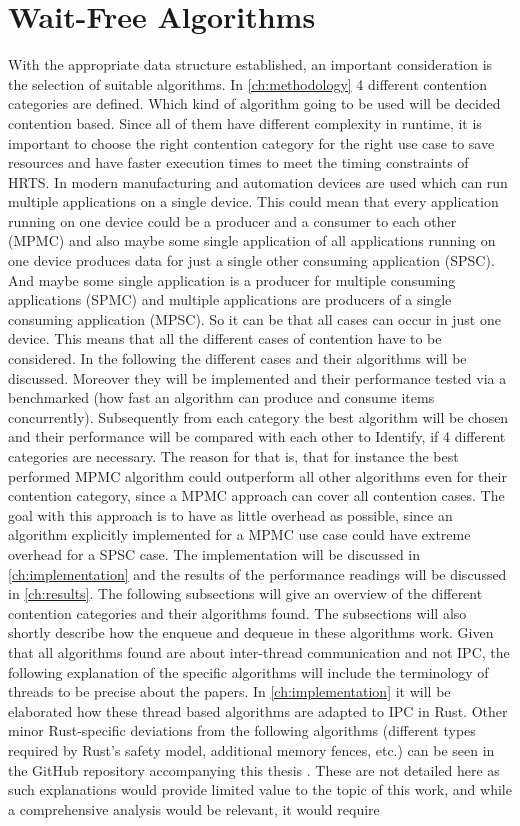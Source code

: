 \section{Wait-Free Algorithms}\label{sec:wait-free-alg}
With the appropriate data structure established, an important consideration is the selection of suitable algorithms. In \cref{ch:methodology} 4 different contention categories are defined. Which kind of algorithm going to be used will be decided contention based. Since all of them have different complexity in runtime, it is important to choose the right contention category for the right use case to save resources and have faster execution times to meet the timing constraints of \ac{HRTS}. In modern manufacturing and automation devices are used which can run multiple applications on a single device. This could mean that every application running on one device could be a producer and a consumer to each other (\ac{MPMC}) and also maybe some single application of all applications running on one device produces data for just a single other consuming application (\ac{SPSC}). And maybe some single application is a producer for multiple consuming applications (\ac{SPMC}) and multiple applications are producers of a single consuming application (\ac{MPSC}). So it can be that all cases can occur in just one device. This means that all the different cases of contention have to be considered. In the following the different cases and their algorithms will be discussed. Moreover they will be implemented and their performance tested via a benchmarked (how fast an algorithm can produce and consume items concurrently). Subsequently from each category the best algorithm will be chosen and their performance will be compared with each other to Identify, if 4 different categories are necessary. The reason for that is, that for instance the best performed \ac{MPMC} algorithm could outperform all other algorithms even for their contention category, since a \ac{MPMC} approach can cover all contention cases. The goal with this approach is to have as little overhead as possible, since an algorithm explicitly implemented for a \ac{MPMC} use case could have extreme overhead for a \ac{SPSC} case. The implementation will be discussed in \cref{ch:implementation} and the results of the performance readings will be discussed in \cref{ch:results}. The following subsections will give an overview of the different contention categories and their algorithms found. The subsections will also shortly describe how the enqueue and dequeue in these algorithms work. Given that all algorithms found are about inter-thread communication and not \ac{IPC}, the following explanation of the specific algorithms will include the terminology of threads to be precise about the papers. In \cref{ch:implementation} it will be elaborated how these thread based algorithms are adapted to \ac{IPC} in Rust. Other minor Rust-specific deviations from the following algorithms (different types required by Rust's safety model, additional memory fences, etc.) can be seen in the GitHub repository accompanying this thesis \cite{githubMA}. These are not detailed here as such explanations would provide limited value to the topic of this work, and while a comprehensive analysis would be relevant, it would require 